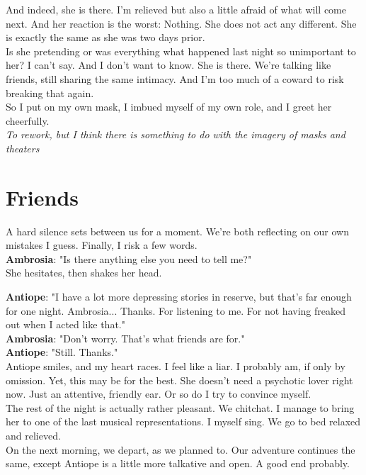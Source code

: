 \documentclass{report}
\newcommand{\dcomment}[1]{
	\emph{#1}
	\\
}
\newcommand{\speaker}[1]{
	\textbf{#1}: 
}
\newcommand{\gsection}[1]{
	\section*{#1}
	\label{#1}
}
\begin{document}
And indeed, she is there. I'm relieved but also a little afraid of what will come next. And her reaction is the worst: Nothing. She does not act any different. She is exactly the same as she was two days prior.\\

Is she pretending or was everything what happened last night so unimportant to her? I can't say. And I don't want to know. She is there. We're talking like friends, still sharing the same intimacy. And I'm too much of a coward to risk breaking that again.\\

So I put on my own mask, I imbued myself of my own role, and I greet her cheerfully.\\

\dcomment{
	To rework, but I think there is something to do with the imagery of masks and theaters
}

\gsection{Friends}

A hard silence sets between us for a moment. We're both reflecting on our own mistakes I guess. Finally, I risk a few words.\\

\speaker{Ambrosia} "Is there anything else you need to tell me?"\\

She hesitates, then shakes her head.

\speaker{Antiope} "I have a lot more depressing stories in reserve, but that's far enough for one night. Ambrosia... Thanks. For listening to me. For not having freaked out when I acted like that."\\

\speaker{Ambrosia} "Don't worry. That's what friends are for."\\

\speaker{Antiope} "Still. Thanks."\\

Antiope smiles, and my heart races. I feel like a liar. I probably am, if only by omission. Yet, this may be for the best. She doesn't need a psychotic lover right now. Just an attentive, friendly ear. Or so do I try to convince myself.\\

The rest of the night is actually rather pleasant. We chitchat. I manage to bring her to one of the last musical representations. I myself sing. We go to bed relaxed and relieved.\\

On the next morning, we depart, as we planned to. Our adventure continues the same, except Antiope is a little more talkative and open. A good end probably.\\
\end{document}
